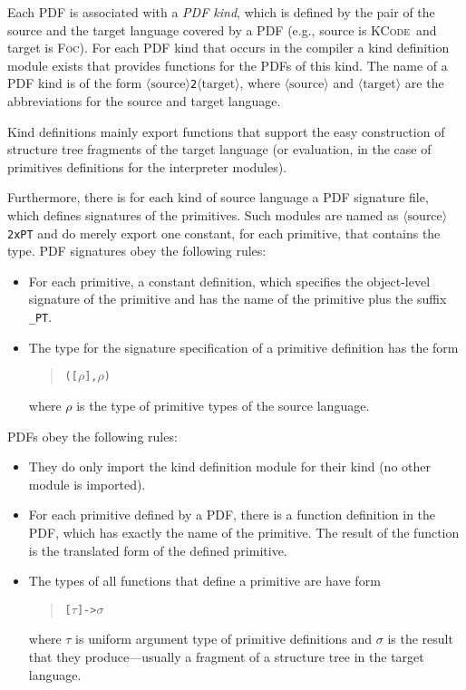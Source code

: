 \documentclass{report}
\newcommand{\FOC}{\textsc{Foc}}
\newcommand{\KCode}{\textsc{KCode}}
\newcommand{\code}[1]{\texttt{#1}}
\newcommand{\nonterm}[1]{\(\langle\textrm{#1}\rangle\)}
\begin{document}
Each PDF is associated with a \emph{PDF kind}, which is defined by the pair of
the source and the target language covered by a PDF (e.g., source is \KCode\ 
and target is \FOC). For each PDF kind that occurs in the compiler a kind
definition module exists that provides functions for the PDFs of this kind.
The name of a PDF kind is of the form \nonterm{source}\code 2\nonterm{target},
where \nonterm{source} and \nonterm{target} are the abbreviations for the
source and target language.

Kind definitions mainly export functions that support the easy construction of
structure tree fragments of the target language (or evaluation, in the case of
primitives definitions for the interpreter modules).

Furthermore, there is for each kind of source language a PDF signature file,
which defines signatures of the primitives. Such modules are named as
\nonterm{source}\code{2xPT} and do merely export one constant, for each
primitive, that contains the type.  PDF signatures obey the following rules:
%
\begin{itemize}
\item For each primitive, a constant definition, which specifies the
  object-level signature of the primitive and has the name of the primitive
  plus the suffix \code{\_PT}.
\item The type for the signature specification of a primitive definition has
  the form
  \begin{quote}
\begin{alltt}
([\(\rho\)], \(\rho\))
\end{alltt}
  \end{quote}
  where $\rho$ is the type of primitive types of the source language.
\end{itemize}

PDFs obey the following rules:
%
\begin{itemize}
\item They do only import the kind definition module for their kind (no other
  module is imported).
\item For each primitive defined by a PDF, there is a function definition in
  the PDF, which has exactly the name of the primitive. The
  result of the function is the translated form of the defined primitive.
\item The types of all functions that define a primitive are have form
  \begin{quote}
\begin{alltt}
[\(\tau\)] -> \(\sigma\)      
\end{alltt}
  \end{quote}
  where $\tau$ is uniform argument type of primitive definitions and $\sigma$
  is the result that they produce---usually a fragment of a structure tree in
  the target language. 
\end{itemize}
\end{document}
